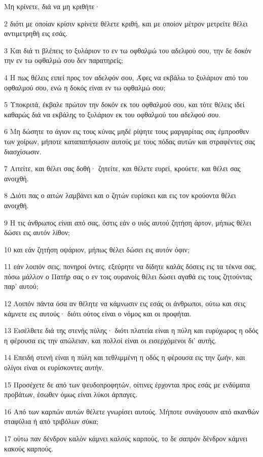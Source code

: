 \par Μη κρίνετε, διά να μη κριθήτε·
\par 2 διότι με οποίαν κρίσιν κρίνετε θέλετε κριθή, και με οποίον μέτρον μετρείτε θέλει αντιμετρηθή εις εσάς.
\par 3 Και διά τι βλέπεις το ξυλάριον το εν τω οφθαλμώ του αδελφού σου, την δε δοκόν την εν τω οφθαλμώ σου δεν παρατηρείς;
\par 4 Η πως θέλεις ειπεί προς τον αδελφόν σου, Άφες να εκβάλω το ξυλάριον από του οφθαλμού σου, ενώ η δοκός είναι εν τω οφθαλμώ σου;
\par 5 Υποκριτά, έκβαλε πρώτον την δοκόν εκ του οφθαλμού σου, και τότε θέλεις ιδεί καθαρώς διά να εκβάλης το ξυλάριον εκ του οφθαλμού του αδελφού σου.
\par 6 Μη δώσητε το άγιον εις τους κύνας μηδέ ρίψητε τους μαργαρίτας σας έμπροσθεν των χοίρων, μήποτε καταπατήσωσιν αυτούς με τους πόδας αυτών και στραφέντες σας διασχίσωσιν.
\par 7 Αιτείτε, και θέλει σας δοθή· ζητείτε, και θέλετε ευρεί, κρούετε, και θέλει σας ανοιχθή.
\par 8 Διότι πας ο αιτών λαμβάνει και ο ζητών ευρίσκει και εις τον κρούοντα θέλει ανοιχθή.
\par 9 Η τις άνθρωπος είναι από σας, όστις εάν ο υιός αυτού ζητήση άρτον, μήπως θέλει δώσει εις αυτόν λίθον;
\par 10 και εάν ζητήση οψάριον, μήπως θέλει δώσει εις αυτόν όφιν;
\par 11 εάν λοιπόν σεις, πονηροί όντες, εξεύρητε να δίδητε καλάς δόσεις εις τα τέκνα σας, πόσω μάλλον ο Πατήρ σας ο εν τοις ουρανοίς θέλει δώσει αγαθά εις τους ζητούντας παρ' αυτού;
\par 12 Λοιπόν πάντα όσα αν θέλητε να κάμνωσιν εις εσάς οι άνθρωποι, ούτω και σεις κάμνετε εις αυτούς· διότι ούτος είναι ο νόμος και οι προφήται.
\par 13 Εισέλθετε διά της στενής πύλης· διότι πλατεία είναι η πύλη και ευρύχωρος η οδός η φέρουσα εις την απώλειαν, και πολλοί είναι οι εισερχόμενοι δι' αυτής.
\par 14 Επειδή στενή είναι η πύλη και τεθλιμμένη η οδός η φέρουσα εις την ζωήν, και ολίγοι είναι οι ευρίσκοντες αυτήν.
\par 15 Προσέχετε δε από των ψευδοπροφητών, οίτινες έρχονται προς εσάς με ενδύματα προβάτων, έσωθεν όμως είναι λύκοι άρπαγες.
\par 16 Από των καρπών αυτών θέλετε γνωρίσει αυτούς. Μήποτε συνάγουσιν από ακανθών σταφύλια ή από τριβόλων σύκα;
\par 17 ούτω παν δένδρον καλόν κάμνει καλούς καρπούς, το δε σαπρόν δένδρον κάμνει κακούς καρπούς.
